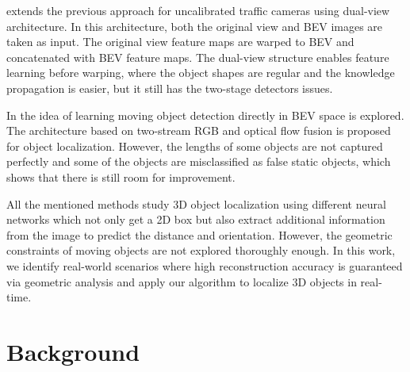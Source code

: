 \documentclass[graybox]{svmult}
\begin{document}
\cite{bev_2} extends the previous approach for uncalibrated traffic cameras using dual-view architecture.
In this architecture, both the original view and BEV images are taken as input. The original view feature maps are warped
to BEV and concatenated with BEV feature maps. The dual-view structure enables feature learning before warping, where the object shapes are regular and the
knowledge propagation is easier, but it still has the two-stage detectors issues.


In \cite{bev_mod} the idea of learning moving object detection directly in BEV space is explored. 
The architecture based on two-stream RGB and optical flow fusion is proposed for object localization.
However, the lengths of some objects are not captured perfectly and some of the objects are misclassified as false static objects, which shows that there is still room for
improvement.

All the mentioned methods study 3D object localization using different neural networks which not only get a 2D box but also extract additional information from the image to predict the distance and orientation.
However, the geometric constraints of moving objects are not explored thoroughly enough. 
In this work, we identify real-world scenarios where high reconstruction accuracy is guaranteed via geometric analysis and apply our algorithm to localize 3D objects in real-time.


\section{Background} \label{sec:back}
\end{document}
